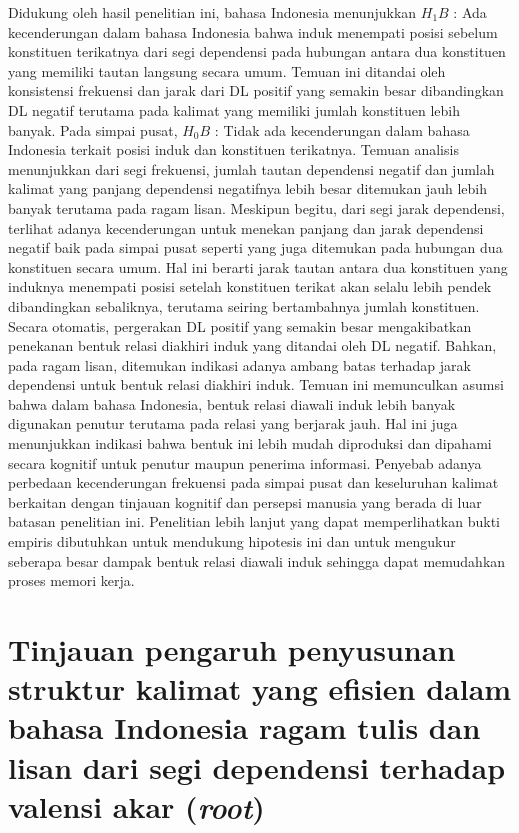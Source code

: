 Didukung oleh hasil penelitian ini, bahasa Indonesia menunjukkan $H_{1}B$ : Ada kecenderungan dalam bahasa Indonesia bahwa induk menempati posisi sebelum konstituen terikatnya dari segi dependensi pada hubungan antara dua konstituen yang memiliki tautan langsung secara umum. Temuan ini ditandai oleh konsistensi frekuensi dan jarak dari DL positif yang semakin besar dibandingkan DL negatif terutama pada kalimat yang memiliki jumlah konstituen lebih banyak. Pada simpai pusat, $H_{0}B$ : Tidak ada kecenderungan dalam bahasa Indonesia terkait posisi induk dan konstituen terikatnya. Temuan analisis menunjukkan dari segi frekuensi, jumlah tautan dependensi negatif dan jumlah kalimat yang panjang dependensi negatifnya lebih besar ditemukan jauh lebih banyak terutama pada ragam lisan. Meskipun begitu, dari segi jarak dependensi, terlihat adanya kecenderungan untuk menekan panjang dan jarak dependensi negatif baik pada simpai pusat seperti yang juga ditemukan pada hubungan dua konstituen secara umum. Hal ini berarti jarak tautan antara dua konstituen yang induknya menempati posisi setelah konstituen terikat akan selalu lebih pendek dibandingkan sebaliknya, terutama seiring bertambahnya jumlah konstituen. Secara otomatis, pergerakan DL positif yang semakin besar mengakibatkan penekanan bentuk relasi diakhiri induk yang ditandai oleh DL negatif. Bahkan, pada ragam lisan, ditemukan indikasi adanya ambang batas terhadap jarak dependensi untuk bentuk relasi diakhiri induk. Temuan ini memunculkan asumsi bahwa dalam bahasa Indonesia, bentuk relasi diawali induk lebih banyak digunakan penutur terutama pada relasi yang berjarak jauh. Hal ini juga menunjukkan indikasi bahwa bentuk ini lebih mudah diproduksi dan dipahami secara kognitif untuk penutur maupun penerima informasi. Penyebab adanya perbedaan kecenderungan frekuensi pada simpai pusat dan keseluruhan kalimat berkaitan dengan tinjauan kognitif dan persepsi manusia yang berada di luar batasan penelitian ini. Penelitian lebih lanjut yang dapat memperlihatkan bukti empiris dibutuhkan untuk mendukung hipotesis ini dan untuk mengukur seberapa besar dampak bentuk relasi diawali induk sehingga dapat memudahkan proses memori kerja. 

\section{Tinjauan pengaruh penyusunan struktur kalimat yang efisien dalam bahasa Indonesia ragam tulis dan lisan dari segi dependensi terhadap valensi akar (\textit{root})}

